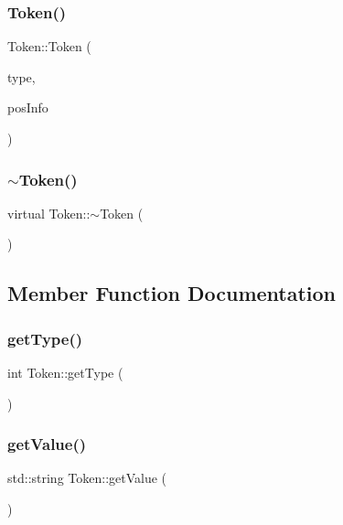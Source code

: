 \subsubsection{\texorpdfstring{Token()}{Token()}}
{\footnotesize\ttfamily Token\+::\+Token (\begin{DoxyParamCaption}\item[{int}]{type,  }\item[{\hyperlink{classPosInfo}{Pos\+Info}}]{pos\+Info }\end{DoxyParamCaption})}

\mbox{\label{classToken_a40b86b9fc63219310f29413cd89d505a}} 
\subsubsection{\texorpdfstring{$\sim$\+Token()}{~Token()}}
{\footnotesize\ttfamily virtual Token\+::$\sim$\+Token (\begin{DoxyParamCaption}{ }\end{DoxyParamCaption})\hspace{0.3cm}{\ttfamily [virtual]}}



\subsection{Member Function Documentation}
\mbox{\label{classToken_a34e68f22453e7d1d41097ab76ddc199a}} 
\subsubsection{\texorpdfstring{get\+Type()}{getType()}}
{\footnotesize\ttfamily int Token\+::get\+Type (\begin{DoxyParamCaption}{ }\end{DoxyParamCaption})}

\mbox{\label{classToken_aeb9ee4b4573bbaab6b33aed601987ff2}} 
\subsubsection{\texorpdfstring{get\+Value()}{getValue()}}
{\footnotesize\ttfamily std\+::string Token\+::get\+Value (\begin{DoxyParamCaption}{ }\end{DoxyParamCaption})}

